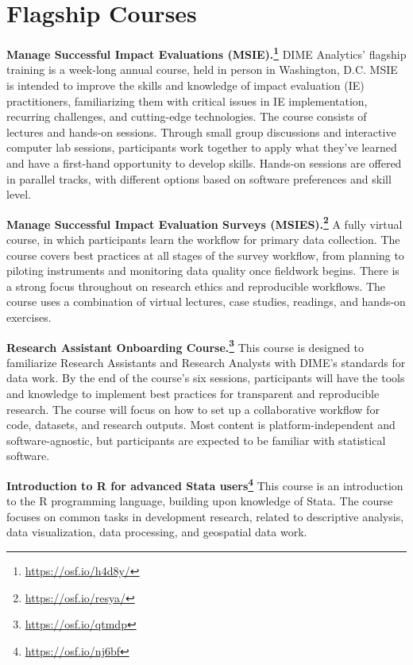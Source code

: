 \section{Flagship Courses}

\textbf{Manage Successful Impact Evaluations (MSIE).\footnote{
		\url{https://osf.io/h4d8y/}}}
DIME Analytics' flagship training is a week-long annual course,
held in person in Washington, D.C.
MSIE is intended to improve the skills and knowledge of
impact evaluation (IE) practitioners,
familiarizing them with critical issues in
IE implementation, recurring challenges,
and cutting-edge technologies.
The course consists of lectures and hands-on sessions.
Through small group discussions and interactive computer lab sessions,
participants work together to apply what they've learned
and have a first-hand opportunity to develop skills.
Hands-on sessions are offered in parallel tracks,
with different options based on software preferences and skill level.

\resourcepar\textbf{Manage Successful Impact Evaluation Surveys (MSIES).\footnote{
		\url{https://osf.io/resya/}}}
A fully virtual course,
in which participants learn the workflow for primary data collection.
The course covers best practices at all stages of the survey workflow,
from planning to piloting instruments
and monitoring data quality once fieldwork begins.
There is a strong focus throughout on research ethics and reproducible workflows.
The course uses a combination of virtual lectures,
case studies, readings, and hands-on exercises.

\resourcepar\textbf{Research Assistant Onboarding Course.\footnote{
		\url{https://osf.io/qtmdp}}}
This course is designed to familiarize Research Assistants and Research Analysts
with DIME's standards for data work.
By the end of the course's six sessions,
participants will have the tools and knowledge to
implement best practices for transparent and reproducible research.
The course will focus on how to set up a collaborative workflow for
code, datasets, and research outputs.
Most content is platform-independent and software-agnostic,
but participants are expected to be familiar with statistical software.

\resourcepar\textbf{Introduction to R for advanced Stata users\footnote{
		\url{https://osf.io/nj6bf}}}
This course is an introduction to the R programming language,
building upon knowledge of Stata.
The course focuses on common tasks in
development research, related to descriptive analysis,
data visualization, data processing, and geospatial data work.


